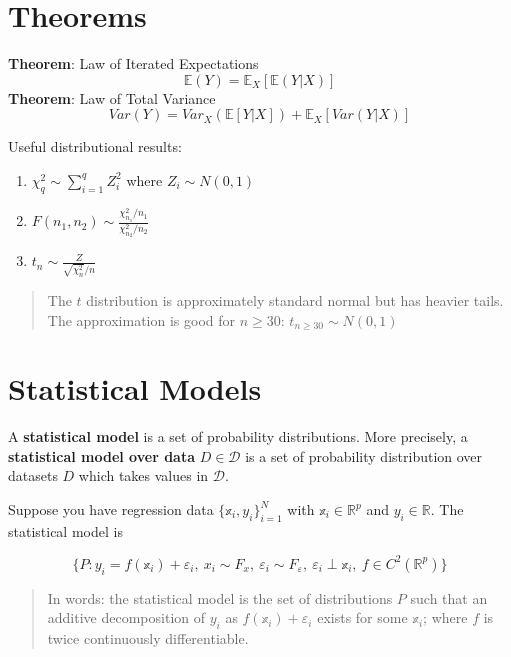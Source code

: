 \documentclass[12pt,]{book}
\providecommand{\tightlist}{%
  \setlength{\itemsep}{0pt}\setlength{\parskip}{0pt}}
\begin{document}
\hypertarget{theorems}{%
\section{Theorems}\label{theorems}}

\textbf{Theorem}:
Law of Iterated Expectations
\[
  \mathbb{E}(Y) = \mathbb{E}_X [\mathbb{E}(Y|X)]
\]
\textbf{Theorem}:
Law of Total Variance
\[
        Var(Y) = Var_X (\mathbb{E}[Y |X]) + \mathbb{E}_X [Var(Y|X)] 
\]

Useful distributional results:

\begin{enumerate}
\def\labelenumi{\arabic{enumi}.}
\tightlist
\item
  \(\chi^2_q \sim \sum _ {i=1}^q Z_i^2\) where \(Z_i \sim N(0,1)\)
\item
  \(F(n_1 , n_2) \sim \frac{\chi^2 _ {n_1} / n_1}{\chi^2 _ {n_2}/n_2}\)
\item
  \(t_n \sim \frac{Z}{\sqrt{\chi^2 _ n}/n }\)
\end{enumerate}

\begin{quote}
The \(t\) distribution is approximately standard normal but has heavier tails. The approximation is good for \(n \geq 30\): \(t_{n\geq 30} \sim N(0,1)\)
\end{quote}

\hypertarget{statistical-models}{%
\section{Statistical Models}\label{statistical-models}}

A \textbf{statistical model} is a set of probability distributions. More precisely, a \textbf{statistical model over data} \(D \in \mathcal{D}\) is a set of probability distribution over datasets \(D\) which takes values in \(\mathcal{D}\).

Suppose you have regression data \(\{ \mathbb{x}_i , y_i \} _ {i=1}^N\) with \(\mathbb{x}_i \in \mathbb{R}^p\) and \(y_i \in \mathbb{R}\). The statistical model is

\[
 \Big\{ P : y_i =  f(\mathbb{x}_i) + \varepsilon_i, \ x_i \sim F_x , \ \varepsilon_i \sim F _\varepsilon , \ \varepsilon_i \perp \mathbb{x}_i , \ f \in C^2 (\mathbb{R}^p) \Big\}
\]

\begin{quote}
In words: the statistical model is the set of distributions \(P\) such that an additive decomposition of \(y_i\) as \(f(\mathbb{x}_i) + \varepsilon_i\) exists for some \(\mathbb{x}_i\); where \(f\) is twice continuously differentiable.
\end{quote}
\end{document}
